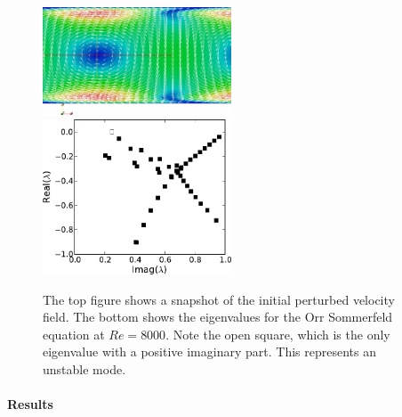 \begin{figure}
\center
\includegraphics[width=0.5\textwidth]{chapters/mortensen/pdf/OS_init.pdf} \\
\includegraphics[width=0.5\textwidth]{chapters/mortensen/pdf/OrrS_eigvals.pdf}
\caption{The top figure shows a snapshot of the initial perturbed velocity
field. The bottom shows the eigenvalues for the Orr Sommerfeld equation
at $Re=8000$. Note the open square, which is the only eigenvalue
with a positive imaginary part. This represents an unstable mode.}
 \label{fig:mortensen:OS_init}
\end{figure}

\paragraph{Results}


